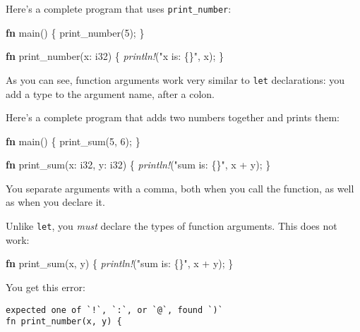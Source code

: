 \documentclass[a4paper,]{book}
\newenvironment{Shaded}{\begin{snugshade}}{\end{snugshade}}
\newcommand{\KeywordTok}[1]{\textcolor[rgb]{0.13,0.29,0.53}{\textbf{{#1}}}}
\newcommand{\DataTypeTok}[1]{\textcolor[rgb]{0.13,0.29,0.53}{{#1}}}
\newcommand{\DecValTok}[1]{\textcolor[rgb]{0.00,0.00,0.81}{{#1}}}
\newcommand{\StringTok}[1]{\textcolor[rgb]{0.31,0.60,0.02}{{#1}}}
\newcommand{\PreprocessorTok}[1]{\textcolor[rgb]{0.56,0.35,0.01}{\textit{{#1}}}}
\newcommand{\NormalTok}[1]{{#1}}
\begin{document}
Here's a complete program that uses \texttt{print\_number}:

\begin{Shaded}
\begin{Highlighting}[]
\KeywordTok{fn} \NormalTok{main() \{}
    \NormalTok{print_number(}\DecValTok{5}\NormalTok{);}
\NormalTok{\}}

\KeywordTok{fn} \NormalTok{print_number(x: }\DataTypeTok{i32}\NormalTok{) \{}
    \PreprocessorTok{println!}\NormalTok{(}\StringTok{"x is: \{\}"}\NormalTok{, x);}
\NormalTok{\}}
\end{Highlighting}
\end{Shaded}

As you can see, function arguments work very similar to \texttt{let}
declarations: you add a type to the argument name, after a colon.

Here's a complete program that adds two numbers together and prints
them:

\begin{Shaded}
\begin{Highlighting}[]
\KeywordTok{fn} \NormalTok{main() \{}
    \NormalTok{print_sum(}\DecValTok{5}\NormalTok{, }\DecValTok{6}\NormalTok{);}
\NormalTok{\}}

\KeywordTok{fn} \NormalTok{print_sum(x: }\DataTypeTok{i32}\NormalTok{, y: }\DataTypeTok{i32}\NormalTok{) \{}
    \PreprocessorTok{println!}\NormalTok{(}\StringTok{"sum is: \{\}"}\NormalTok{, x + y);}
\NormalTok{\}}
\end{Highlighting}
\end{Shaded}

You separate arguments with a comma, both when you call the function, as
well as when you declare it.

Unlike \texttt{let}, you \emph{must} declare the types of function
arguments. This does not work:

\begin{Shaded}
\begin{Highlighting}[]
\KeywordTok{fn} \NormalTok{print_sum(x, y) \{}
    \PreprocessorTok{println!}\NormalTok{(}\StringTok{"sum is: \{\}"}\NormalTok{, x + y);}
\NormalTok{\}}
\end{Highlighting}
\end{Shaded}

You get this error:

\begin{verbatim}
expected one of `!`, `:`, or `@`, found `)`
fn print_number(x, y) {
\end{verbatim}
\end{document}
